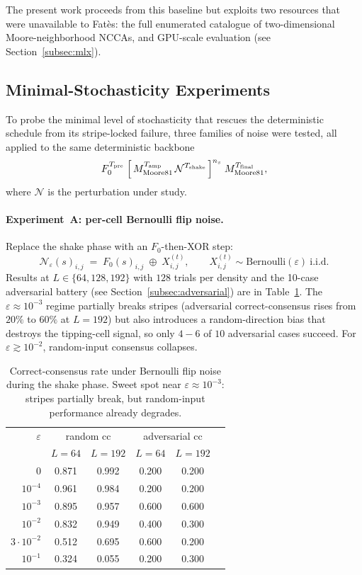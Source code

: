 \documentclass[11pt,a4paper]{article}
\begin{document}
The present work proceeds from this baseline but exploits two resources that
were unavailable to Fat\`{e}s: the full enumerated catalogue of two-dimensional
Moore-neighborhood NCCAs, and GPU-scale evaluation (see
Section~\ref{subsec:mlx}).

\subsection{Minimal-Stochasticity Experiments}
\label{subsec:minimal-eps}

To probe the minimal level of stochasticity that rescues the deterministic
schedule from its stripe-locked failure, three families of noise were tested,
all applied to the same deterministic backbone
\[
F_0^{T_{\mathrm{pre}}}
\;\Bigl[\,M_{\mathrm{Moore81}}^{T_{\mathrm{amp}}}\,\mathcal{N}^{T_{\mathrm{shake}}}\,\Bigr]^{n_s}
\;M_{\mathrm{Moore81}}^{T_{\mathrm{final}}},
\]
where \(\mathcal{N}\) is the perturbation under study.

\paragraph{Experiment~A: per-cell Bernoulli flip noise.}
Replace the shake phase with an \(F_0\)-then-XOR step:
\[
\mathcal{N}_\varepsilon(s)_{i,j} \;=\; F_0(s)_{i,j}\;\oplus\;X^{(t)}_{i,j},
\qquad X^{(t)}_{i,j}\sim\mathrm{Bernoulli}(\varepsilon)\ \text{i.i.d.}
\]
Results at \(L\in\{64,128,192\}\) with \(128\) trials per density and the
10-case adversarial battery (see Section~\ref{subsec:adversarial}) are in
Table~\ref{tab:epsilon-flip}.  The \(\varepsilon\approx 10^{-3}\) regime
partially breaks stripes (adversarial correct-consensus rises from
\(20\%\) to \(60\%\) at \(L=192\)) but also introduces a random-direction
bias that destroys the tipping-cell signal, so only \(4{-}6\) of \(10\)
adversarial cases succeed.  For \(\varepsilon \gtrsim 10^{-2}\), random-input
consensus collapses.

\begin{table}[h]\centering\small
\begin{tabular}{r ccccc}
\toprule
$\varepsilon$ & \multicolumn{2}{c}{random cc} & \multicolumn{2}{c}{adversarial cc} \\
 & $L=64$ & $L=192$ & $L=64$ & $L=192$ \\
\midrule
$0$         & 0.871 & 0.992 & 0.200 & 0.200 \\
$10^{-4}$   & 0.961 & 0.984 & 0.200 & 0.200 \\
$10^{-3}$   & 0.895 & 0.957 & 0.600 & 0.600 \\
$10^{-2}$   & 0.832 & 0.949 & 0.400 & 0.300 \\
$3\cdot 10^{-2}$ & 0.512 & 0.695 & 0.600 & 0.200 \\
$10^{-1}$   & 0.324 & 0.055 & 0.200 & 0.300 \\
\bottomrule
\end{tabular}
\caption{Correct-consensus rate under Bernoulli flip noise during the shake
phase.  Sweet spot near \(\varepsilon\approx 10^{-3}\): stripes partially break,
but random-input performance already degrades.}
\label{tab:epsilon-flip}
\end{table}
\end{document}
